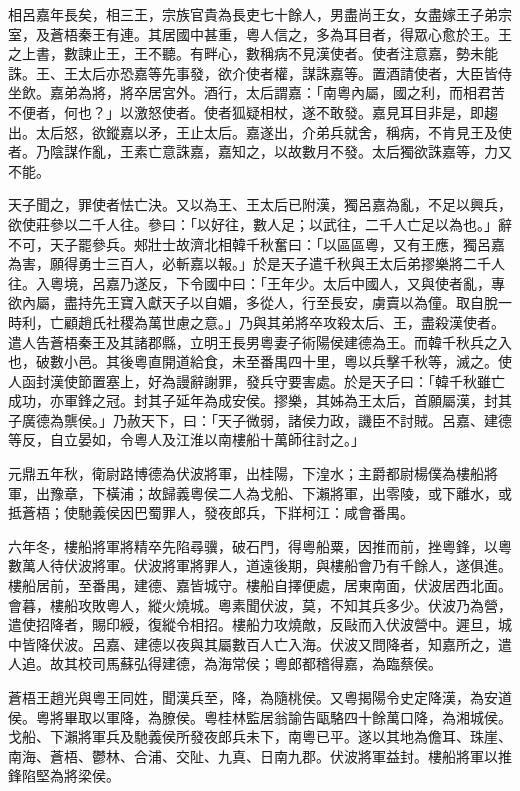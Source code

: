 \begin{pinyinscope}
相呂嘉年長矣，相三王，宗族官貴為長吏七十餘人，男盡尚王女，女盡嫁王子弟宗室，及蒼梧秦王有連。其居國中甚重，粵人信之，多為耳目者，得眾心愈於王。王之上書，數諫止王，王不聽。有畔心，數稱病不見漢使者。使者注意嘉，勢未能誅。王、王太后亦恐嘉等先事發，欲介使者權，謀誅嘉等。置酒請使者，大臣皆侍坐飲。嘉弟為將，將卒居宮外。酒行，太后謂嘉：「南粵內屬，國之利，而相君苦不便者，何也？」以激怒使者。使者狐疑相杖，遂不敢發。嘉見耳目非是，即趨出。太后怒，欲鏦嘉以矛，王止太后。嘉遂出，介弟兵就舍，稱病，不肯見王及使者。乃陰謀作亂，王素亡意誅嘉，嘉知之，以故數月不發。太后獨欲誅嘉等，力又不能。

天子聞之，罪使者怯亡決。又以為王、王太后已附漢，獨呂嘉為亂，不足以興兵，欲使莊參以二千人往。參曰：「以好往，數人足；以武往，二千人亡足以為也。」辭不可，天子罷參兵。郟壯士故濟北相韓千秋奮曰：「以區區粵，又有王應，獨呂嘉為害，願得勇士三百人，必斬嘉以報。」於是天子遣千秋與王太后弟摎樂將二千人往。入粵境，呂嘉乃遂反，下令國中曰：「王年少。太后中國人，又與使者亂，專欲內屬，盡持先王寶入獻天子以自媚，多從人，行至長安，虜賣以為僮。取自脫一時利，亡顧趙氏社稷為萬世慮之意。」乃與其弟將卒攻殺太后、王，盡殺漢使者。遣人告蒼梧秦王及其諸郡縣，立明王長男粵妻子術陽侯建德為王。而韓千秋兵之入也，破數小邑。其後粵直開道給食，未至番禺四十里，粵以兵擊千秋等，滅之。使人函封漢使節置塞上，好為謾辭謝罪，發兵守要害處。於是天子曰：「韓千秋雖亡成功，亦軍鋒之冠。封其子延年為成安侯。摎樂，其姊為王太后，首願屬漢，封其子廣德為龒侯。」乃赦天下，曰：「天子微弱，諸侯力政，譏臣不討賊。呂嘉、建德等反，自立晏如，令粵人及江淮以南樓船十萬師往討之。」

元鼎五年秋，衛尉路博德為伏波將軍，出桂陽，下湟水；主爵都尉楊僕為樓船將軍，出豫章，下橫浦；故歸義粵侯二人為戈船、下瀨將軍，出零陵，或下離水，或抵蒼梧；使馳義侯因巴蜀罪人，發夜郎兵，下牂柯江：咸會番禺。

六年冬，樓船將軍將精卒先陷尋骥，破石門，得粵船粟，因推而前，挫粵鋒，以粵數萬人待伏波將軍。伏波將軍將罪人，道遠後期，與樓船會乃有千餘人，遂俱進。樓船居前，至番禺，建德、嘉皆城守。樓船自擇便處，居東南面，伏波居西北面。會暮，樓船攻敗粵人，縱火燒城。粵素聞伏波，莫，不知其兵多少。伏波乃為營，遣使招降者，賜印綬，復縱令相招。樓船力攻燒敵，反敺而入伏波營中。遲旦，城中皆降伏波。呂嘉、建德以夜與其屬數百人亡入海。伏波又問降者，知嘉所之，遣人追。故其校司馬蘇弘得建德，為海常侯；粵郎都稽得嘉，為臨蔡侯。

蒼梧王趙光與粵王同姓，聞漢兵至，降，為隨桃侯。又粵揭陽令史定降漢，為安道侯。粵將畢取以軍降，為膫侯。粵桂林監居翁諭告甌駱四十餘萬口降，為湘城侯。戈船、下瀨將軍兵及馳義侯所發夜郎兵未下，南粵已平。遂以其地為儋耳、珠崖、南海、蒼梧、鬱林、合浦、交阯、九真、日南九郡。伏波將軍益封。樓船將軍以推鋒陷堅為將梁侯。


\end{pinyinscope}

